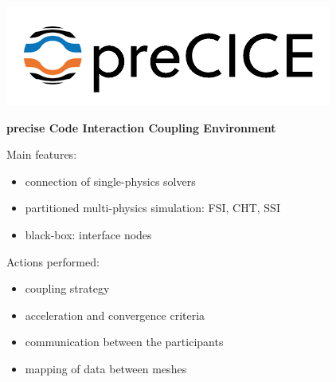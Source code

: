 \documentclass[10pt,t]{beamer}
\begin{document}
\begin{frame}{\includegraphics[width=.22\textwidth]{images/precice.png}}

\textbf{\textcolor{dorange}{pre}cise \textcolor{pblue}{C}ode \textcolor{pblue}{I}nteraction \textcolor{pblue}{C}oupling \textcolor{pblue}{E}nvironment}

\vspace{5mm}

Main features:

    \begin{itemize}
        \item connection of single-physics solvers
        \item partitioned multi-physics simulation: FSI, CHT, SSI
        \item black-box: interface nodes 
    \end{itemize}

\pause
\vspace{5mm}

Actions performed: 

\begin{itemize}
	\item coupling strategy
	\item acceleration and convergence criteria
	\item communication between the participants
	\item mapping of data between meshes 
\end{itemize}

\end{frame}
\end{document}
